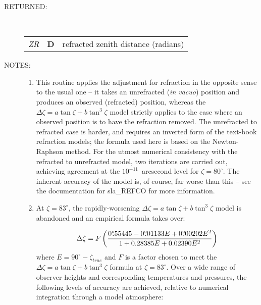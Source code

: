 \documentclass[11pt,twoside]{article}
\newlength{\oldspacing}
\newcommand{\args}[2]
{
  \goodbreak
  \setlength{\oldspacing}{\topsep}
  \setlength{\topsep}{0.3ex}
  \begin{description}
  \item[#1]:\\[1.5ex]
    \begin{tabular}{p{7em}p{6em}p{22em}}
      #2
    \end{tabular}
  \end{description}
  \setlength{\topsep}{\oldspacing}
}
\renewcommand{\args}[2]
   {
     \begin{description}
        \item[#1:]\\
        \begin{tabular}{p{7em}p{6em}l}
           #2
        \end{tabular}
     \end{description}
   }
\newcommand{\spec}[3]
{
  {\em {#1}} & {\bf \mbox{#2}} & {#3}
}
\newcommand{\notes}[1]
{
  \goodbreak
  \setlength{\oldspacing}{\topsep}
  \setlength{\topsep}{0.3ex}
  \begin{description}
    \item[NOTES]:
        #1
  \end{description}
  \setlength{\topsep}{\oldspacing}
}
\renewcommand{\notes}[1]
   {
      \begin{description}
         \item[NOTES:]
            #1
      \end{description}
   }
\begin{document}
\args{RETURNED}
{
 \spec{ZR}{D}{refracted zenith distance (radians)}
}
\notes
{
 \begin{enumerate}
  \item This routine applies the adjustment for refraction in the
        opposite sense to the usual one -- it takes an unrefracted
        ({\it in vacuo}\/) position and produces an observed (refracted)
        position, whereas the
        $\Delta \zeta = a \tan \zeta + b \tan^{3} \zeta$
        model strictly
        applies to the case where an observed position is to have the
        refraction removed.  The unrefracted to refracted case is
        harder, and requires an inverted form of the text-book
        refraction models;  the formula used here is based on the
        Newton-Raphson method.  For the utmost numerical consistency
        with the refracted to unrefracted model, two iterations are
        carried out, achieving agreement at the $10^{-11}$~arcsecond level
        for $\zeta=80^\circ$.  The inherent accuracy of the model
        is, of course, far worse than this -- see the documentation for
        sla\_REFCO for more information.
  \item At $\zeta=83^\circ$, the rapidly-worsening
        $\Delta \zeta = a \tan \zeta + b \tan^{3} \zeta$
        model is abandoned and an empirical formula takes over:

          \[\Delta \zeta = F \left(
  \frac{0^\circ\hspace{-0.37em}.\hspace{0.02em}55445
                - 0^\circ\hspace{-0.37em}.\hspace{0.02em}01133 E
                          + 0^\circ\hspace{-0.37em}.\hspace{0.02em}00202 E^2}
             {1 + 0.28385 E +0.02390 E^2} \right) \]
        where $E=90^\circ-\zeta_{true}$
        and $F$ is a factor chosen to meet the
        $\Delta \zeta = a \tan \zeta + b \tan^{3} \zeta$
        formula at $\zeta=83^\circ$.  Over a
        wide range of observer heights and corresponding temperatures and
        pressures, the following levels of accuracy are achieved,
        relative to numerical integration through a model atmosphere:


\end{enumerate}}
\end{document}
